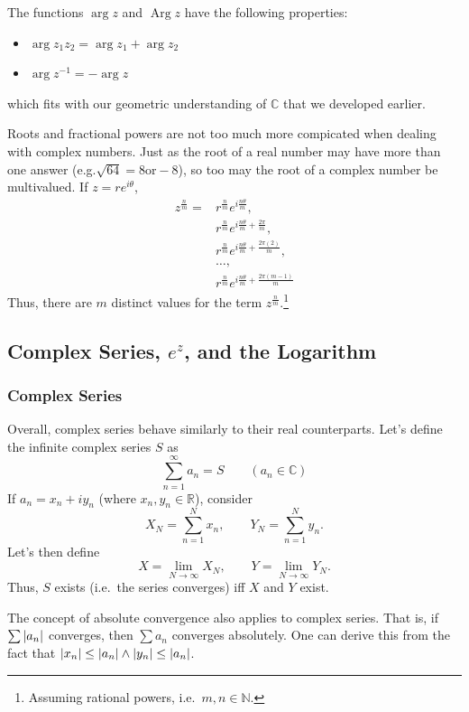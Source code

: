 \documentclass[10pt]{scrartcl}
\numberwithin{equation}{subsection}
\theoremstyle{definition}
\theoremstyle{remark}
\newcommand{\Reals}{\mathbb{R}}
\newcommand{\Complex}{\mathbb{C}}
\newcommand{\inv}[1]{
		{#1}^{-1}
	}
\DeclareMathOperator{\Arg}{Arg}
\begin{document}
The functions $\arg{z}$ and $\Arg{z}$ have the following properties:
\begin{itemize}
	\item $\arg{z_1 z_2} = \arg{z_1} + \arg{z_2}$
	\item $\arg{\inv{z}} = - \arg{z}$
\end{itemize}
which fits with our geometric understanding of $\Complex$ that we developed 
earlier.

Roots and fractional powers are not too much more compicated when dealing with 
complex numbers. Just as the root of a real number may have more
than one answer (e.g.$\sqrt{64} = 8 \text{or} -8$), so too may the root of a 
complex number be multivalued. If $z = re^{i\theta}$,
\begin{align*}
	z^\frac{n}{m} = &r^\frac{n}{m} e^{i\frac{n\theta}{m}},\\ 
					&r^\frac{n}{m} e^{i\frac{n\theta}{m} + \frac{2\pi}{m}},\\ 
					&r^\frac{n}{m}e^{i\frac{n\theta}{m} + \frac{2\pi(2)}{m}},\\ 
					&\ldots,\\
					&r^\frac{n}{m} e^{i\frac{n\theta}{m} + \frac{2\pi(m-1)}{m}}
\end{align*}
Thus, there are $m$ distinct values for the term $z^\frac{n}{m}$.\footnote{Assuming
rational powers, i.e.\ $m,n \in \mathbb{N}$.}
\subsection{Complex Series, $e^z$, and the Logarithm}
\subsubsection{Complex Series}
Overall, complex series behave similarly to their real counterparts.
Let's define the infinite complex series $S$ as 
\begin{equation}
	\sum_{n=1}^{\infty} a_n = S \qquad (a_n \in \Complex)
\end{equation}
If $a_n = x_n + i y_n$ (where $x_n, y_n \in \Reals$), consider
\[
	X_N = \sum_{n=1}^{N} x_n, \qquad Y_N = \sum_{n=1}^{N} y_n.
\]
Let's then define
\[
	X = \lim_{N \to \infty} X_N, \qquad Y = \lim_{N \to \infty} Y_N.
\]
Thus, $S$ exists (i.e.\ the series converges) iff $X$ and $Y$ exist.

The concept of absolute convergence also applies to complex series.
That is, if $\sum \abs{a_n}$ converges, then $ \sum a_n$ converges absolutely. 
One can derive this from the fact that $\abs{x_n} \leq \abs{a_n} \wedge
\abs{y_n} \leq \abs{a_n}$.
\end{document}
